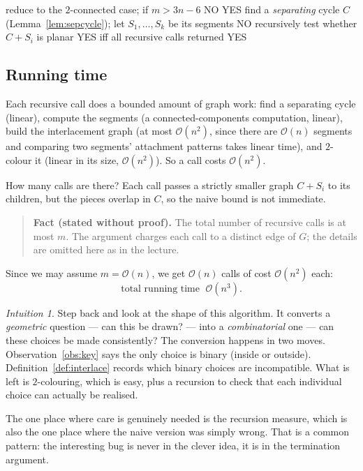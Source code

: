 \documentclass[11pt,a4paper]{article}
\theoremstyle{plain}
\theoremstyle{definition}
\theoremstyle{remark}
\newtheorem*{intuition}{Intuition}
\newcommand{\bigoh}[1]{\mathcal{O}\!\left(#1\right)}
\begin{document}
\begin{algorithm}[ht]
\caption{Planarity test (corrected)}
\label{alg:planar}
\begin{algorithmic}[1]
  \State reduce to the $2$-connected case; if $m > 3n-6$ \Return NO
    \State \Return YES
  \EndIf
  \State find a \emph{separating} cycle $C$ (Lemma~\ref{lem:sepcycle}); let
         $S_1,\dots,S_k$ be its segments
    \State \Return NO
  \EndIf
    \State recursively test whether $C + S_i$ is planar
  \EndFor
  \State \Return YES iff all recursive calls returned YES
\end{algorithmic}
\end{algorithm}

\subsection{Running time}

Each recursive call does a bounded amount of graph work: find a separating
cycle (linear), compute the segments (a connected-components computation,
linear), build the interlacement graph (at most $\bigoh{n^2}$, since there are
$\bigoh{n}$ segments and comparing two segments' attachment patterns takes
linear time), and $2$-colour it (linear in its size, $\bigoh{n^2}$). So a call
costs $\bigoh{n^2}$.

How many calls are there? Each call passes a strictly smaller graph
$C + S_i$ to its children, but the pieces overlap in $C$, so the naive bound
is not immediate.

\begin{quote}
\textbf{Fact (stated without proof).} The total number of recursive calls is
at most $m$. The argument charges each call to a distinct edge of $G$; the
details are omitted here as in the lecture.
\end{quote}

Since we may assume $m = \bigoh{n}$, we get $\bigoh{n}$ calls of cost
$\bigoh{n^2}$ each:
\[
  \text{total running time } \; \bigoh{n^3}.
\]

\begin{intuition}
Step back and look at the shape of this algorithm. It converts a
\emph{geometric} question --- can this be drawn? --- into a
\emph{combinatorial} one --- can these choices be made consistently? The
conversion happens in two moves. Observation~\ref{obs:key} says the only choice
is binary (inside or outside). Definition~\ref{def:interlace} records which
binary choices are incompatible. What is left is $2$-colouring, which is easy,
plus a recursion to check that each individual choice can actually be realised.

The one place where care is genuinely needed is the recursion measure, which is
also the one place where the naive version was simply wrong. That is a common
pattern: the interesting bug is never in the clever idea, it is in the
termination argument.
\end{intuition}
\end{document}
